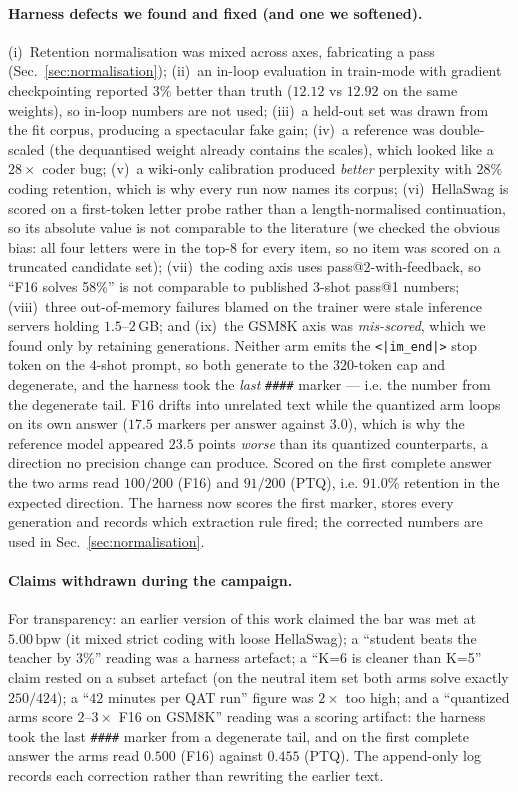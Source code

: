 \documentclass[11pt,a4paper]{article}
\newcommand{\bpw}{\,\mathrm{bpw}}
\begin{document}
\paragraph{Harness defects we found and fixed (and one we softened).}
(i)~Retention normalisation was mixed across axes, fabricating a pass (Sec.~\ref{sec:normalisation});
(ii)~an in-loop evaluation in train-mode with gradient checkpointing reported $3\%$ better than
truth ($12.12$ vs $12.92$ on the same weights), so in-loop numbers are not used;
(iii)~a held-out set was drawn from the fit corpus, producing a spectacular fake gain;
(iv)~a reference was double-scaled (the dequantised weight already contains the scales), which
looked like a $28\times$ coder bug;
(v)~a wiki-only calibration produced \emph{better} perplexity with $28\%$ coding retention, which
is why every run now names its corpus;
(vi)~HellaSwag is scored on a first-token letter probe rather than a length-normalised
continuation, so its absolute value is not comparable to the literature (we checked the obvious
bias: all four letters were in the top-8 for every item, so no item was scored on a truncated
candidate set);
(vii)~the coding axis uses pass@2-with-feedback, so ``F16 solves 58\%'' is not comparable to
published 3-shot pass@1 numbers;
(viii)~three out-of-memory failures blamed on the trainer were stale inference servers holding
$1.5$--$2$\,GB; and (ix)~the GSM8K axis was \emph{mis-scored}, which we found only by retaining
generations. Neither arm emits the \texttt{<|im\_end|>} stop token on the $4$-shot prompt, so both
generate to the $320$-token cap and degenerate, and the harness took the \emph{last}
\texttt{\#\#\#\#} marker --- i.e. the number from the degenerate tail. F16 drifts into unrelated
text while the quantized arm loops on its own answer ($17.5$ markers per answer against $3.0$),
which is why the reference model appeared $23.5$ points \emph{worse} than its quantized
counterparts, a direction no precision change can produce. Scored on the first complete answer the
two arms read $100/200$ (F16) and $91/200$ (PTQ), i.e. $91.0\%$ retention in the expected direction.
The harness now scores the first marker, stores every generation and records which extraction rule
fired; the corrected numbers are used in Sec.~\ref{sec:normalisation}.

\paragraph{Claims withdrawn during the campaign.} For transparency: an earlier version of this
work claimed the bar was met at $5.00\bpw$ (it mixed strict coding with loose HellaSwag); a
``student beats the teacher by $3\%$'' reading was a harness artefact; a ``K=6 is cleaner than
K=5'' claim rested on a subset artefact (on the neutral item set both arms solve exactly
$250/424$); a ``$42$ minutes per QAT run'' figure was $2\times$ too high; and a ``quantized arms score
$2$--$3\times$ F16 on GSM8K'' reading was a scoring artifact: the harness took the last
\texttt{\#\#\#\#} marker from a degenerate tail, and on the first complete answer the arms read
$0.500$ (F16) against $0.455$ (PTQ). The append-only log
records each correction rather than rewriting the earlier text.
\end{document}
